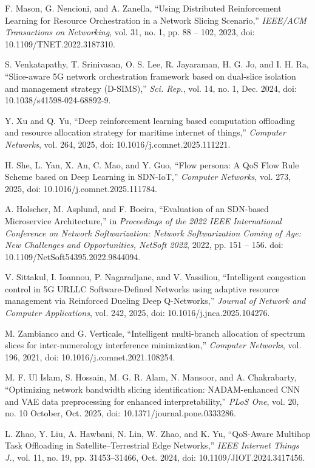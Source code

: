 \cite{b28} F. Mason, G. Nencioni, and A. Zanella, ``Using Distributed Reinforcement Learning for Resource Orchestration in a Network Slicing Scenario,'' \emph{IEEE/ACM Transactions on Networking}, vol. 31, no. 1, pp. 88 -- 102, 2023, doi: 10.1109/TNET.2022.3187310.

\cite{b29} S. Venkatapathy, T. Srinivasan, O. S. Lee, R. Jayaraman, H. G. Jo, and I. H. Ra, ``Slice-aware 5G network orchestration framework based on dual-slice isolation and management strategy (D-SIMS),'' \emph{Sci. Rep.}, vol. 14, no. 1, Dec. 2024, doi: 10.1038/s41598-024-68892-9.

\cite{b30} Y. Xu and Q. Yu, ``Deep reinforcement learning based computation offloading and resource allocation strategy for maritime internet of things,'' \emph{Computer Networks}, vol. 264, 2025, doi: 10.1016/j.comnet.2025.111221.

\cite{b31} H. She, L. Yan, X. An, C. Mao, and Y. Guo, ``Flow persona: A QoS Flow Rule Scheme based on Deep Learning in SDN-IoT,'' \emph{Computer Networks}, vol. 273, 2025, doi: 10.1016/j.comnet.2025.111784.

\cite{b32} A. Holscher, M. Asplund, and F. Boeira, ``Evaluation of an SDN-based Microservice Architecture,'' in \emph{Proceedings of the 2022 IEEE International Conference on Network Softwarization: Network Softwarization Coming of Age: New Challenges and Opportunities, NetSoft 2022}, 2022, pp. 151 -- 156. doi: 10.1109/NetSoft54395.2022.9844094.

\cite{b33} V. Sittakul, I. Ioannou, P. Nagaradjane, and V. Vassiliou, ``Intelligent congestion control in 5G URLLC Software-Defined Networks using adaptive resource management via Reinforced Dueling Deep Q-Networks,'' \emph{Journal of Network and Computer Applications}, vol. 242, 2025, doi: 10.1016/j.jnca.2025.104276.

\cite{b34} M. Zambianco and G. Verticale, ``Intelligent multi-branch allocation of spectrum slices for inter-numerology interference minimization,'' \emph{Computer Networks}, vol. 196, 2021, doi: 10.1016/j.comnet.2021.108254.

\cite{b35} M. F. Ul Islam, S. Hossain, M. G. R. Alam, N. Mansoor, and A. Chakrabarty, ``Optimizing network bandwidth slicing identification: NADAM-enhanced CNN and VAE data preprocessing for enhanced interpretability,'' \emph{PLoS One}, vol. 20, no. 10 October, Oct. 2025, doi: 10.1371/journal.pone.0333286.

\cite{b36} L. Zhao, Y. Liu, A. Hawbani, N. Lin, W. Zhao, and K. Yu, ``QoS-Aware Multihop Task Offloading in Satellite--Terrestrial Edge Networks,'' \emph{IEEE Internet Things J.}, vol. 11, no. 19, pp. 31453--31466, Oct. 2024, doi: 10.1109/JIOT.2024.3417456.

